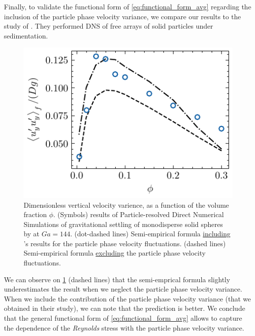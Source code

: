 Finally, to validate the functional form of \ref{eq:functional_form_avg} regarding the inclusion of the particle phase velocity variance, we compare our results to the study of \citet{shajahan2023inertial}. 
They performed DNS of free arrays of solid particles under sedimentation.  
\begin{figure}
    \centering
    \includegraphics[height = 0.25\textwidth]{image/HOMOGENEOUS_final/CA/tariq.pdf}
    \caption{Dimensionless vertical velocity varience, as a function of the volume fraction $\phi$. 
    (Symbols) results of Particle-resolved Direct Numerical Simulations  of gravitational settling of monodisperse solid spheres by \citet{shajahan2023inertial} at $Ga = 144$. 
    (dot-dashed lines) Semi-empirical formula \underline{including} \citet{shajahan2023inertial}'s results for the particle phase velocity fluctuations. 
    (dashed lines) Semi-empirical formula \underline{excluding} the particle phase velocity fluctuations. 
    }
    \label{fig:tariq}
\end{figure}
We can observe on \ref{fig:tariq} (dashed lines) that the semi-emprical formula slightly underestimates the result when we neglect the particle phase velocity variance. 
When we include the contribution of the particle phase velocity variance (that we obtained in their study), we can note that the prediction is better. 
We conclude that the general functional form of \ref{eq:functional_form_avg} allows to capture the dependence of the \textit{Reynolds} stress with the particle phase velocity variance. 
